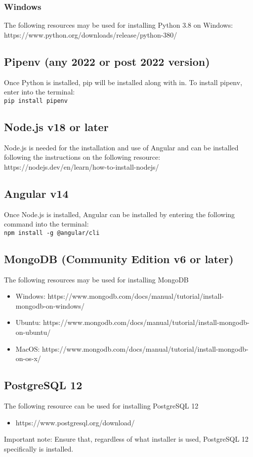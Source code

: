 \documentclass{article}
\newcommand{\code}[1]{\colorbox{light-gray}{\texttt{#1}}}
\begin{document}
\subsubsection{Windows}
The following resources may be used for installing Python 3.8 on Windows:
https://www.python.org/downloads/release/python-380/

\subsection{Pipenv (any 2022 or post 2022 version)}
Once Python is installed, pip will be installed along with in. To install pipenv, enter into the terminal:\\
\code{pip install pipenv}

\subsection{Node.js v18 or later}
Node.js is needed for the installation and use of Angular and can be installed
following the instructions on the following resource:\\
https://nodejs.dev/en/learn/how-to-install-nodejs/

\subsection{Angular v14}
Once Node.js is installed, Angular can be installed by entering the following command into the terminal:\\
\code{npm install -g @angular/cli}

\subsection{MongoDB (Community Edition v6 or later)}
The following resources may be used for installing MongoDB
\begin{itemize}
    \item Windows: https://www.mongodb.com/docs/manual/tutorial/install-mongodb-on-windows/
    \item Ubuntu: https://www.mongodb.com/docs/manual/tutorial/install-mongodb-on-ubuntu/
    \item MacOS: https://www.mongodb.com/docs/manual/tutorial/install-mongodb-on-os-x/
\end{itemize}

\subsection{PostgreSQL 12}
The following resource can be used for installing PostgreSQL 12
\begin{itemize}
    \item https://www.postgresql.org/download/
\end{itemize}
Important note: Ensure that, regardless of what installer is used, PostgreSQL 12 specifically is installed.
\end{document}
